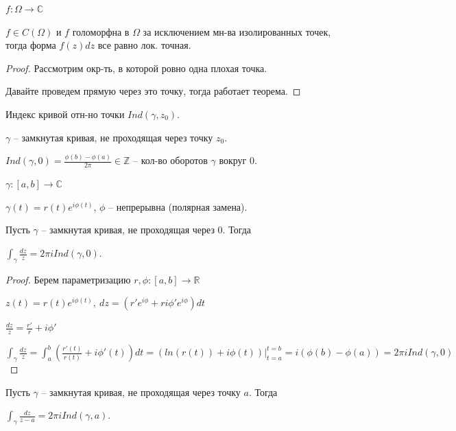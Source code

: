\begin{consequence}
    $f: \Omega \rightarrow \mathbb{C}$

    $f \in C(\Omega)$ и $f$ голоморфна в $\Omega$ за исключением мн-ва изолированных точек, тогда форма $f(z) dz$ все равно лок. точная.
\end{consequence}
\begin{proof}
    Рассмотрим окр-ть, в которой ровно одна плохая точка.

    Давайте проведем прямую через это точку, тогда работает теорема.
\end{proof}

\begin{definition}
    Индекс кривой отн-но точки $Ind(\gamma, z_0)$.

    $\gamma$ -- замкнутая кривая, не проходящая через точку $z_0$.

    $Ind(\gamma, 0) = \frac{\phi(b) - \phi(a)}{2\pi} \in \mathbb{Z}$ -- кол-во оборотов $\gamma$ вокруг 0.

    $\gamma: [a, b] \rightarrow \mathbb{C}$

    $\gamma(t) = r(t) e^{i \phi(t)}$, $\phi$ -- непрерывна (полярная замена).
\end{definition}

\begin{theorem}
    Пусть $\gamma$ -- замкнутая кривая, не проходящая через 0. Тогда

    $\int_{\gamma} { \frac{d z}{z} } = 2\pi i Ind(\gamma, 0)$.
\end{theorem}
\begin{proof}
    Берем параметризацию $r, \phi: [a, b] \rightarrow \mathbb{R}$

    $z(t) = r(t) e^{i \phi(t)}, \ dz = \left( r' e^{i\phi} + ri \phi' e^{i\phi} \right) dt$

    $\frac{dz}{z} = \frac{r'}{r} + i \phi'$

    $\int_{\gamma} { \frac{dz}{z} } = \int_{a}^{b} { \left( \frac{r'(t)}{r(t)} + i \phi'(t) \right) dt } = \left( ln (r(t)) + i \phi(t) \right)|_{t = a}^{t = b} = i (\phi(b) - \phi(a)) = 2 \pi i Ind(\gamma, 0)$
\end{proof}

\begin{consequence}
    Пусть $\gamma$ -- замкнутая кривая, не проходящая через точку $a$. Тогда

    $\int_{\gamma} { \frac{dz}{z - a} = 2 \pi i Ind (\gamma, a) }$.
\end{consequence}


